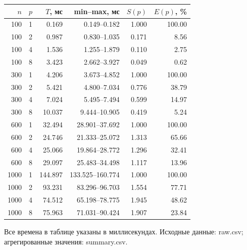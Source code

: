 \begin{center}
\begin{tabular}{rrrrrr}
\hline
$n$ & $p$ & $T$, мс & min--max, мс & $S(p)$ & $E(p)$, \%\\\hline
100 & 1 & 0.169 & 0.149--0.182 & 1.000 & 100.00 \\
100 & 2 & 0.987 & 0.830--1.035 & 0.171 & 8.56 \\
100 & 4 & 1.536 & 1.255--1.879 & 0.110 & 2.75 \\
100 & 8 & 3.423 & 2.662--3.927 & 0.049 & 0.62 \\
300 & 1 & 4.206 & 3.673--4.852 & 1.000 & 100.00 \\
300 & 2 & 5.421 & 4.800--7.034 & 0.776 & 38.79 \\
300 & 4 & 7.024 & 5.495--7.494 & 0.599 & 14.97 \\
300 & 8 & 10.037 & 9.444--10.905 & 0.419 & 5.24 \\
600 & 1 & 32.494 & 28.901--37.692 & 1.000 & 100.00 \\
600 & 2 & 24.746 & 21.333--25.072 & 1.313 & 65.66 \\
600 & 4 & 25.066 & 19.864--28.772 & 1.296 & 32.41 \\
600 & 8 & 29.097 & 25.483--34.498 & 1.117 & 13.96 \\
1000 & 1 & 144.897 & 133.525--160.774 & 1.000 & 100.00 \\
1000 & 2 & 93.231 & 83.296--96.703 & 1.554 & 77.71 \\
1000 & 4 & 74.512 & 65.198--78.775 & 1.945 & 48.62 \\
1000 & 8 & 75.963 & 71.031--90.424 & 1.907 & 23.84 \\
\hline
\end{tabular}
\end{center}
Все времена в таблице указаны в миллисекундах. Исходные данные: raw.csv; агрегированные значения: summary.csv.
